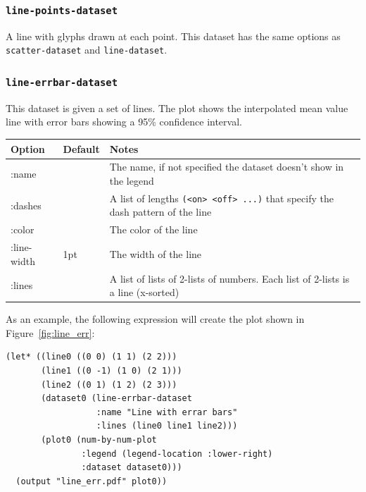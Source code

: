 \documentclass{article}
\begin{document}
\subsubsection{\tt line-points-dataset}

A line with glyphs drawn at each point.  This dataset has the same
options as {\tt scatter-dataset} and {\tt line-dataset}.

\subsubsection{\tt line-errbar-dataset}

This dataset is given a set of lines.  The plot shows the interpolated
mean value line with error bars showing a 95\% confidence interval.

\begin{center}
\begin{tabular}{lll}
Option & Default & Notes \\
\hline
:name & & The name, if not specified the dataset doesn't show in
the legend\\
:dashes & & A list of lengths {\tt (<on> <off> ...)} that specify the
dash pattern of the line\\
:color & & The color of the line\\
:line-width & 1pt & The width of the line\\
:lines & & A list of lists of 2-lists of numbers.  Each list of
2-lists is a line (x-sorted)\\
\end{tabular}
\end{center}

As an example, the following expression will create the plot shown in
Figure~\ref{fig:line_err}:

\begin{verbatim}
(let* ((line0 ((0 0) (1 1) (2 2)))
       (line1 ((0 -1) (1 0) (2 1)))
       (line2 ((0 1) (1 2) (2 3)))
       (dataset0 (line-errbar-dataset
                  :name "Line with errar bars"
                  :lines (line0 line1 line2)))
       (plot0 (num-by-num-plot
               :legend (legend-location :lower-right)
               :dataset dataset0)))
  (output "line_err.pdf" plot0))
\end{verbatim}
\end{document}
